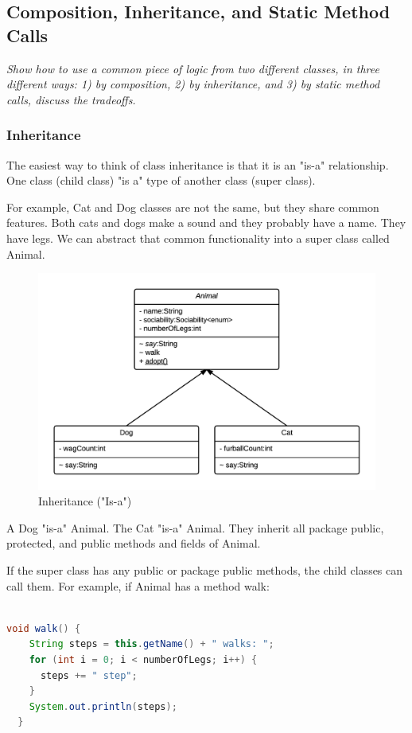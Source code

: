 \subsection{Composition, Inheritance, and Static Method Calls}
\textit{Show how to use a common piece of logic from two different classes, in three different ways: 1) by composition, 2) by inheritance, and 3) by static method calls, discuss the tradeoffs.}

\subsubsection{Inheritance}
The easiest way to think of class inheritance is that it is an "is-a" relationship. One class (child class) "is a" type of another class (super class).

For example, Cat and Dog classes are not the same, but they share common features. Both cats and dogs make a sound and they probably have a name. They have legs. We can abstract that common functionality into a super class called Animal.

\begin{figure}[H]\centering %
\includegraphics[width=0.9\linewidth]{images/inheritance}
\caption{Inheritance ("Is-a")}
\label{fig:inheritance}
\end{figure}

A Dog "is-a" Animal. The Cat "is-a" Animal. They inherit all package public, protected, and public methods and fields of Animal.

If the super class has any public or package public methods, the child classes can call them. For example, if Animal has a method walk:
\begin{lstlisting}[language=Java]

void walk() {
    String steps = this.getName() + " walks: ";
    for (int i = 0; i < numberOfLegs; i++) {
      steps += " step";
    }
    System.out.println(steps);
  }

\end{lstlisting}

